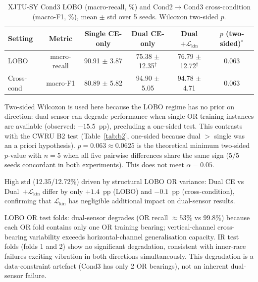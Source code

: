 \begin{table}[htbp]
\centering
\caption{XJTU-SY Cond3 LOBO (macro-recall, \%) and
         Cond2$\to$Cond3 cross-condition (macro-F1, \%),
         mean $\pm$ std over 5 seeds. Wilcoxon two-sided $p$.}
\label{tab:xjtu}
\begin{tabular}{lcccc c}
\toprule
Setting & Metric & Single CE-only & Dual CE-only & Dual $+\mathcal{L}_{\text{kin}}$ & $p$ (two-sided)$^{*}$ \\
\midrule
LOBO       & macro-recall & 90.91 $\pm$ 3.87  & 75.38 $\pm$ 12.35$^\dagger$ & 76.79 $\pm$ 12.72$^\dagger$ & 0.063 \\
Cross-cond & macro-F1     & 80.89 $\pm$ 5.82  & 94.90 $\pm$ 5.05            & 94.78 $\pm$ 4.71            & 0.063 \\
\bottomrule
\end{tabular}
\begin{tablenotes}
\item[$*$] Two-sided Wilcoxon is used here because the LOBO regime has no prior
           on direction: dual-sensor can degrade performance when single OR training
           instances are available (observed: $-15.5$~pp), precluding a one-sided
           test. This contrasts with the CWRU B2 test (Table~\ref{tab:b2},
           one-sided because dual $>$ single was an a priori hypothesis).
           $p = 0.063 \approx 0.0625$ is the theoretical minimum two-sided $p$-value
           with $n = 5$ when all five pairwise differences share the same sign
           (5/5 seeds concordant in both experiments). This does not meet
           $\alpha = 0.05$.
\item[$\dagger$] High std (12.35/12.72\%) driven by structural LOBO OR variance:
           Dual CE vs Dual~$+\mathcal{L}_{\text{kin}}$ differ by only $+1.4$~pp (LOBO)
           and $-0.1$~pp (cross-condition), confirming that $\mathcal{L}_{\text{kin}}$
           has negligible additional impact on dual-sensor results.
\item LOBO OR test folds: dual-sensor degrades (OR recall $\approx 53\%$ vs
      $99.8\%$) because each OR fold contains only one OR training bearing;
      vertical-channel cross-bearing variability exceeds horizontal-channel
      generalisation capacity.
      IR test folds (folds 1 and 2) show no significant degradation,
      consistent with inner-race failures exciting vibration in both
      directions simultaneously.
      This degradation is a data-constraint artefact (Cond3 has only 2 OR
      bearings), not an inherent dual-sensor failure.

\end{tablenotes}
\end{table}
